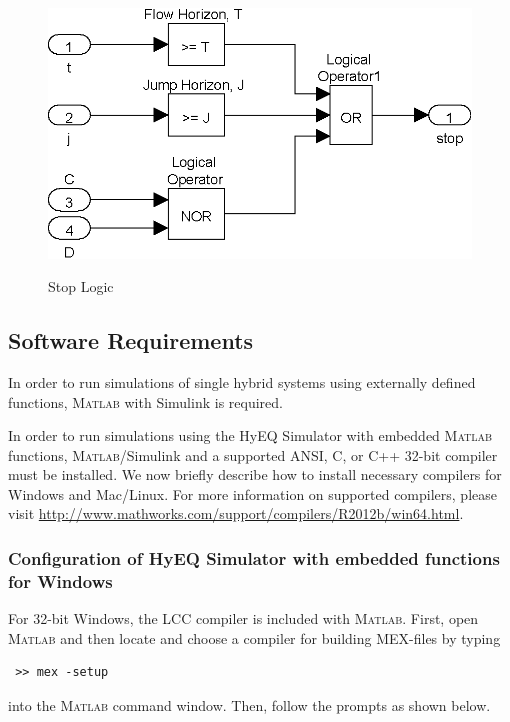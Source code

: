 \documentclass{article}
\newcommand{\matlab}{\textsc{Matlab}}
\begin{document}
\begin{figure}[ht]
  \begin{center}
    {\includegraphics[width=.5\textwidth]{figures/Simulink/StopLogic.eps}}
   \caption{Stop Logic}
\label{fig:StopLogic}
  \end{center}
\end{figure}

%

\subsection{Software Requirements}
In order to run simulations of single hybrid systems using externally defined functions, 
\matlab{} with Simulink is required.

In order to run simulations using the HyEQ Simulator with embedded \matlab{} functions, 
\matlab{}/Simulink and a supported ANSI, C, or C++ 32-bit compiler must be installed. 
We now briefly describe how to install necessary compilers for Windows and Mac/Linux. 
For more information on supported compilers, please visit 
\url{http://www.mathworks.com/support/compilers/R2012b/win64.html}.


\subsubsection{Configuration of HyEQ Simulator with embedded functions for Windows}
For 32-bit Windows, the LCC compiler is included with \matlab{}. 
First, open \matlab{} and then locate and choose a compiler for 
building MEX-files by typing \begin{verbatim} >> mex -setup \end{verbatim}
into the \matlab{} command window. Then, follow the prompts as shown below.
\end{document}
